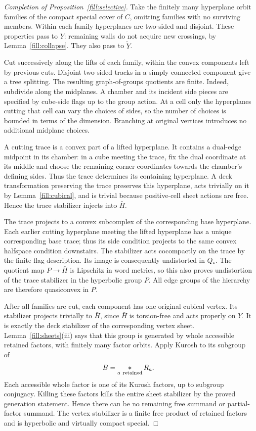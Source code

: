 \begin{proof}[Completion of Proposition~\ref{fill:selective}]
Take the finitely many hyperplane orbit families of the compact special
cover of \(C\), omitting families with no surviving members.  Within
each family hyperplanes are two-sided and disjoint.  These properties
pass to \(Y\): remaining walls do not acquire new crossings, by
Lemma~\ref{fill:collapse}.  They also pass to \(\widetilde Y\).

Cut successively along the lifts of each family, within the convex
components left by previous cuts.  Disjoint two-sided tracks in a
simply connected component give a tree splitting.  The resulting
graph-of-groups quotients are finite.  Indeed, subdivide along the
midplanes.  A chamber and its incident side pieces are specified by
cube-side flags up to the group action.  At a cell only the hyperplanes
cutting that cell can vary the choices of sides, so the number of
choices is bounded in terms of the dimension.  Branching at original
vertices introduces no additional midplane choices.

A cutting trace is a convex part of a lifted hyperplane.  It contains
a dual-edge midpoint in its chamber: in a cube meeting the trace, fix
the dual coordinate at its middle and choose the remaining corner
coordinates towards the chamber's defining sides.  Thus the trace
determines its containing hyperplane.  A deck transformation preserving
the trace preserves this hyperplane, acts trivially on it by
Lemma~\ref{fill:cubical}, and is trivial because positive-cell sheet
actions are free.  Hence the trace stabilizer injects into \(\bar H\).

The trace projects to a convex subcomplex of the corresponding base
hyperplane.  Each earlier cutting hyperplane meeting the lifted
hyperplane has a unique corresponding base trace; thus its side
condition projects to the same convex halfspace condition downstairs.
The stabilizer acts cocompactly on the trace by the finite flag
description.  Its image is consequently undistorted in \(Q_*\).
The quotient map \(P\to\bar H\) is Lipschitz in word metrics, so this
also proves undistortion of the trace stabilizer in the hyperbolic
group \(P\).  All edge groups of the hierarchy are therefore
quasiconvex in \(P\).

After all families are cut, each component has one original cubical
vertex.  Its stabilizer projects trivially to \(\bar H\), since
\(\bar H\) is torsion-free and acts properly on \(Y\).  It is exactly
the deck stabilizer of the corresponding vertex sheet.
Lemma~\ref{fill:sheets}(iii) says that this group is generated by
whole accessible retained factors, with finitely many factor orbits.
Apply Kurosh to its subgroup of
\[
 B=\mathop{*}_{a\ {\rm retained}}R_a.
\]
Each accessible whole factor is one of its Kurosh factors, up to
subgroup conjugacy.  Killing these factors kills the entire sheet
stabilizer by the proved generation statement.  Hence there can be
no remaining free summand or partial-factor summand.  The vertex
stabilizer is a finite free product of retained factors and is
hyperbolic and virtually compact special.


\end{proof}
